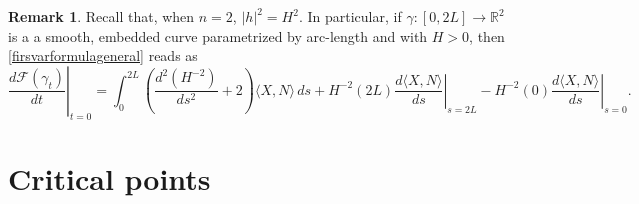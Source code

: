 \documentclass[11pt]{amsart}
\newcommand{\F}{\mathcal F}
\newcommand{\rr}{{\mathbb{R}}}
\theoremstyle{definition}
\newtheorem{remark}[theorem]{Remark}
\theoremstyle{remark}
\numberwithin{equation}{section}
\begin{document}
	\begin{remark}
		Recall that, when $n=2$, $|h|^2=H^2$. In particular, if $\gamma:[0,2L]\to\rr^2$ is a a smooth, embedded curve parametrized by arc-length and with $H>0$, then \eqref{firsvarformulageneral} reads as
		\begin{equation*}
			\left.\frac{d\F(\gamma_t)}{dt}\right|_{t=0}=\int_0^{2L}\left(\frac{d^2\left(H^{-2}\right)}{ds^2}+2\right)\langle X,N\rangle\,ds+ H^{-2}(2L)\left.\frac{d\langle X,N\rangle}{ds}\right|_{s=2L}-H^{-2}(0)\left.\frac{d\langle X,N\rangle}{ds}\right|_{s=0}.
		\end{equation*}
	\end{remark}
	\section{Critical points}\label{sec_criticalpoints}
\end{document}
